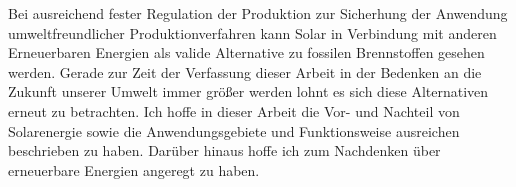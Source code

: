 Bei ausreichend fester Regulation der Produktion zur Sicherhung
der Anwendung umweltfreundlicher Produktionverfahren kann Solar
in Verbindung mit anderen Erneuerbaren Energien als valide
Alternative zu fossilen Brennstoffen gesehen werden. Gerade zur
Zeit der Verfassung dieser Arbeit in der Bedenken an die Zukunft
unserer Umwelt immer größer werden lohnt es sich diese
Alternativen erneut zu betrachten. Ich hoffe in dieser Arbeit die
Vor- und Nachteil von Solarenergie sowie die Anwendungsgebiete
und Funktionsweise ausreichen beschrieben zu haben. Darüber
hinaus hoffe ich zum Nachdenken über erneuerbare Energien
angeregt zu haben.